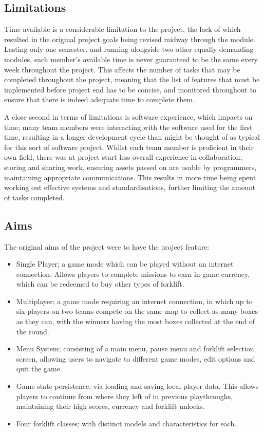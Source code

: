 \documentclass[12pt]{article}
\begin{document}
\subsection{Limitations}
Time available is a considerable limitation to the project, the lack of which resulted in the original project goals being revised midway through the module. Lasting only one semester, and running alongside two other equally demanding modules, each member’s available time is never guaranteed to be the same every week throughout the project. This affects the number of tasks that may be completed throughout the project, meaning that the list of features that must be implemented before project end has to be concise, and monitored throughout to ensure that there is indeed adequate time to complete them.

A close second in terms of limitations is software experience, which impacts on time; many team members were interacting with the software used for the first time, resulting in a longer development cycle than might be thought of as typical for this sort of software project. Whilst each team member is proficient in their own field, there was at project start less overall experience in collaboration; storing and sharing work, ensuring assets passed on are usable by programmers, maintaining appropriate communications. This results in more time being spent working out effective systems and standardisations, further limiting the amount of tasks completed.


\subsection{Aims}
The original aims of the project were to have the project feature:
\begin{itemize}
	\item Single Player; a game mode which can be played without an internet connection. Allows players to complete missions to earn in-game currency, which can be redeemed to buy other types of forklift.
	\item Multiplayer; a game mode requiring an internet connection, in which up to six players on two teams compete on the same map to collect as many boxes as they can, with the winners having the most boxes collected at the end of the round.
	\item Menu System; consisting of a main menu, pause menu and forklift selection screen, allowing users to navigate to different game modes, edit options and quit the game. 
	\item Game state persistence; via loading and saving local player data. This allows players to continue from where they left of in previous playthroughs, maintaining their high scores, currency and forklift unlocks.
	\item Four forklift classes; with distinct models and characteristics for each.
\end{itemize}
\end{document}
